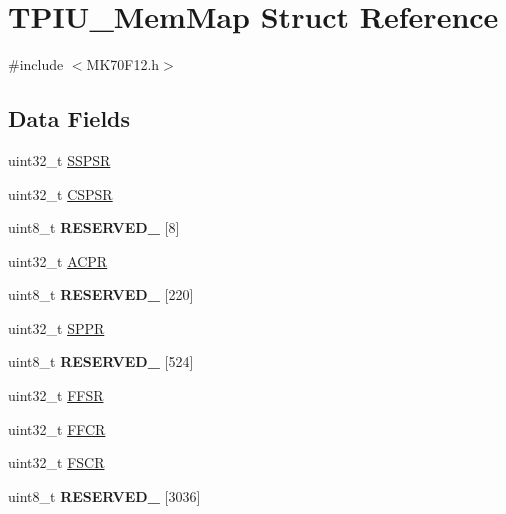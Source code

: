 \hypertarget{struct_t_p_i_u___mem_map}{}\section{T\+P\+I\+U\+\_\+\+Mem\+Map Struct Reference}
\label{struct_t_p_i_u___mem_map}


{\ttfamily \#include $<$M\+K70\+F12.\+h$>$}

\subsection*{Data Fields}
\begin{DoxyCompactItemize}
\item 
uint32\+\_\+t \hyperlink{struct_t_p_i_u___mem_map_a3570cf26e2ddc1d5700776743b0506e3}{S\+S\+P\+S\+R}
\item 
uint32\+\_\+t \hyperlink{struct_t_p_i_u___mem_map_a9f8c3b9dcdcb9d2677b661fe2f8a5489}{C\+S\+P\+S\+R}
\item 
\hypertarget{struct_t_p_i_u___mem_map_a7f1e970de71aa3def6bdd4ff5ca6e0fc}{}uint8\+\_\+t {\bfseries R\+E\+S\+E\+R\+V\+E\+D\+\_} \mbox{[}8\mbox{]}\label{struct_t_p_i_u___mem_map_a7f1e970de71aa3def6bdd4ff5ca6e0fc}

\item 
uint32\+\_\+t \hyperlink{struct_t_p_i_u___mem_map_a007e503f472f605b40c6f7425e4bdf77}{A\+C\+P\+R}
\item 
\hypertarget{struct_t_p_i_u___mem_map_a1f32f0c1a3bb1f5b84aab2aebb0f8c8c}{}uint8\+\_\+t {\bfseries R\+E\+S\+E\+R\+V\+E\+D\+\_} \mbox{[}220\mbox{]}\label{struct_t_p_i_u___mem_map_a1f32f0c1a3bb1f5b84aab2aebb0f8c8c}

\item 
uint32\+\_\+t \hyperlink{struct_t_p_i_u___mem_map_a1b821d4f74563499ff569877ae672742}{S\+P\+P\+R}
\item 
\hypertarget{struct_t_p_i_u___mem_map_ae71bb17bd9d36839896cdc4132574344}{}uint8\+\_\+t {\bfseries R\+E\+S\+E\+R\+V\+E\+D\+\_} \mbox{[}524\mbox{]}\label{struct_t_p_i_u___mem_map_ae71bb17bd9d36839896cdc4132574344}

\item 
uint32\+\_\+t \hyperlink{struct_t_p_i_u___mem_map_ada0d6c32bb6a91e5edfcbbe7f37e6fd6}{F\+F\+S\+R}
\item 
uint32\+\_\+t \hyperlink{struct_t_p_i_u___mem_map_a34d81bddad51a7dcdbf76548b3809d82}{F\+F\+C\+R}
\item 
uint32\+\_\+t \hyperlink{struct_t_p_i_u___mem_map_a86904c5ac326d4cca551c4fb45a9f9ba}{F\+S\+C\+R}
\item 
\hypertarget{struct_t_p_i_u___mem_map_ad18d4a1b7a55cd48c435ffab34425cd2}{}uint8\+\_\+t {\bfseries R\+E\+S\+E\+R\+V\+E\+D\+\_} \mbox{[}3036\mbox{]}\label{struct_t_p_i_u___mem_map_ad18d4a1b7a55cd48c435ffab34425cd2}


\end{DoxyCompactItemize}
